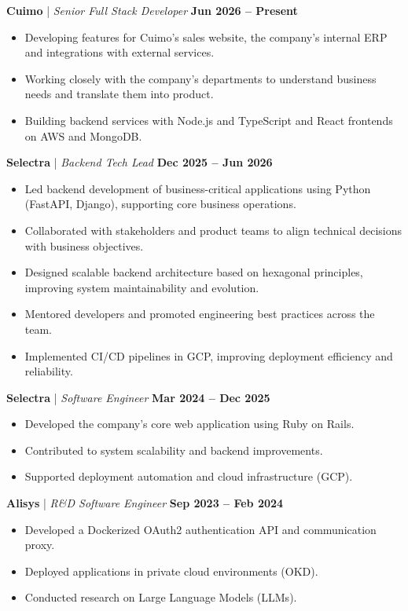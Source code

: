 \documentclass[10pt,a4paper]{article}
\begin{document}
\textbf{Cuimo} | \textit{Senior Full Stack Developer} \hfill \textbf{Jun 2026 -- Present}
\begin{itemize}
    \item Developing features for Cuimo's sales website, the company's internal ERP and integrations with external services.
    \item Working closely with the company's departments to understand business needs and translate them into product.
    \item Building backend services with Node.js and TypeScript and React frontends on AWS and MongoDB.
\end{itemize}

\vspace{6pt}

\textbf{Selectra} | \textit{Backend Tech Lead} \hfill \textbf{Dec 2025 -- Jun 2026}
\begin{itemize}
    \item Led backend development of business-critical applications using Python (FastAPI, Django), supporting core business operations.
    \item Collaborated with stakeholders and product teams to align technical decisions with business objectives.
    \item Designed scalable backend architecture based on hexagonal principles, improving system maintainability and evolution.
    \item Mentored developers and promoted engineering best practices across the team.
    \item Implemented CI/CD pipelines in GCP, improving deployment efficiency and reliability.
\end{itemize}

\vspace{6pt}

\textbf{Selectra} | \textit{Software Engineer} \hfill \textbf{Mar 2024 -- Dec 2025}
\begin{itemize}
    \item Developed the company's core web application using Ruby on Rails.
    \item Contributed to system scalability and backend improvements.
    \item Supported deployment automation and cloud infrastructure (GCP).
\end{itemize}

\vspace{6pt}

\textbf{Alisys} | \textit{R\&D Software Engineer} \hfill \textbf{Sep 2023 -- Feb 2024}
\begin{itemize}
    \item Developed a Dockerized OAuth2 authentication API and communication proxy.
    \item Deployed applications in private cloud environments (OKD).
    \item Conducted research on Large Language Models (LLMs).
\end{itemize}
\end{document}
